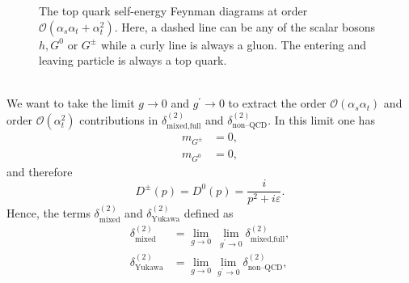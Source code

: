\documentclass[a4paper,12pt]{book}
\begin{document}
\begin{figure} [h]
\centering
{} 
\hspace*{1.5cm}
\caption{The top quark self-energy Feynman diagrams at order $\mathcal{O}(\alpha_s\alpha_t+\alpha_t^2)$. Here, a dashed line can be any of the scalar bosons $h, G^0$ or $G^\pm$ while a curly line is always a gluon. The entering and leaving particle is always a top quark.} 
\label{fig::diagrams}
\end{figure}\\
We want to take the limit $g\rightarrow 0$ and $g^\prime \rightarrow 0$ to extract the order $\mathcal{O}(\alpha_s\alpha_t)$ and order $\mathcal{O}(\alpha_t^2)$ contributions in $\delta^{(2)}_\text{mixed,full}$ and $\delta^{(2)}_\text{non--QCD}$. In this limit one has 
\begin{align}
m_{G^\pm} &= 0,\\
m_{G^0} &= 0,
\end{align} 
and therefore
\begin{equation}
D^\pm(p)=D^0(p)= \frac{i}{p^2+i\varepsilon}.
\end{equation}
Hence, the terms $\delta^{(2)}_\text{mixed}$ and $\delta^{(2)}_\text{Yukawa}$ defined as
\begin{align}
\delta^{(2)}_\text{mixed} &= \lim_{g \rightarrow 0} \> \lim_{g^\prime \rightarrow 0} \delta^{(2)}_\text{mixed,full},\\
\delta^{(2)}_\text{Yukawa} &= \lim_{g \rightarrow 0} \lim_{g^\prime \rightarrow 0} \delta^{(2)}_\text{non--QCD},
\end{align}
\end{document}
